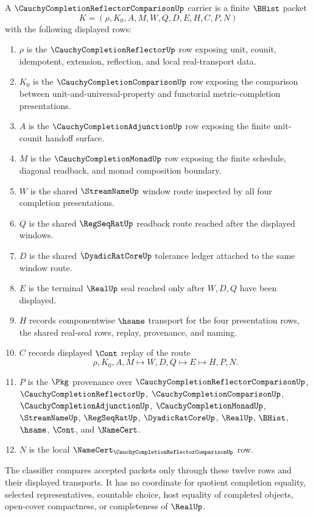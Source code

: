 \begin{definition}
\label{def:cauchy-completion-reflector-comparison-carrier}
A $\CauchyCompletionReflectorComparisonUp$ carrier is a finite $\BHist$ packet
$$
K=(\rho,K_0,A,M,W,Q,D,E,H,C,P,N)
$$
with the following displayed rows:
\begin{enumerate}
\item $\rho$ is the $\CauchyCompletionReflectorUp$ row exposing unit, counit, idempotent, extension, reflection, and local real-transport data.
\item $K_0$ is the $\CauchyCompletionComparisonUp$ row exposing the comparison between unit-and-universal-property and functorial metric-completion presentations.
\item $A$ is the $\CauchyCompletionAdjunctionUp$ row exposing the finite unit-counit handoff surface.
\item $M$ is the $\CauchyCompletionMonadUp$ row exposing the finite schedule, diagonal readback, and monad composition boundary.
\item $W$ is the shared $\StreamNameUp$ window route inspected by all four completion presentations.
\item $Q$ is the shared $\RegSeqRatUp$ readback route reached after the displayed windows.
\item $D$ is the shared $\DyadicRatCoreUp$ tolerance ledger attached to the same window route.
\item $E$ is the terminal $\RealUp$ seal reached only after $W,D,Q$ have been displayed.
\item $H$ records componentwise $\hsame$ transport for the four presentation rows, the shared real-seal rows, replay, provenance, and naming.
\item $C$ records displayed $\Cont$ replay of the route
$$
\rho,K_0,A,M \longmapsto W,D,Q \longmapsto E \longmapsto H,P,N .
$$
\item $P$ is the $\Pkg$ provenance over $\CauchyCompletionReflectorComparisonUp$, $\CauchyCompletionReflectorUp$, $\CauchyCompletionComparisonUp$, $\CauchyCompletionAdjunctionUp$, $\CauchyCompletionMonadUp$, $\StreamNameUp$, $\RegSeqRatUp$, $\DyadicRatCoreUp$, $\RealUp$, $\BHist$, $\hsame$, $\Cont$, and $\NameCert$.
\item $N$ is the local $\NameCert_{\CauchyCompletionReflectorComparisonUp}$ row.
\end{enumerate}
The classifier compares accepted packets only through these twelve rows and their displayed transports. It has no coordinate for quotient completion equality, selected representatives, countable choice, host equality of completed objects, open-cover compactness, or completeness of $\RealUp$.
\end{definition}

